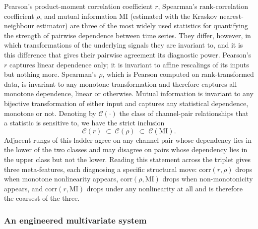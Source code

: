 \documentclass{article}
\theoremstyle{plain}
\theoremstyle{definition}
\theoremstyle{remark}
\begin{document}
Pearson's product-moment correlation coefficient $r$, Spearman's rank-correlation coefficient $\rho$, and mutual information $\mathrm{MI}$ (estimated with the Kraskov nearest-neighbour estimator) are three of the most widely used statistics for quantifying the strength of pairwise dependence between time series. They differ, however, in which transformations of the underlying signals they are invariant to, and it is this difference that gives their pairwise agreement its diagnostic power. Pearson's $r$ captures linear dependence only; it is invariant to affine rescalings of its inputs but nothing more. Spearman's $\rho$, which is Pearson computed on rank-transformed data, is invariant to any monotone transformation and therefore captures all monotone dependence, linear or otherwise. Mutual information is invariant to any bijective transformation of either input and captures any statistical dependence, monotone or not. Denoting by $\mathcal{C}(\cdot)$ the class of channel-pair relationships that a statistic is sensitive to, we have the strict inclusion
\begin{equation*}
\mathcal{C}(r) \;\subset\; \mathcal{C}(\rho) \;\subset\; \mathcal{C}(\mathrm{MI}).
\end{equation*}
Adjacent rungs of this ladder agree on any channel pair whose dependency lies in the lower of the two classes and may disagree on pairs whose dependency lies in the upper class but not the lower. Reading this statement across the triplet gives three meta-features, each diagnosing a specific structural move: $\mathrm{corr}(r,\rho)$ drops when monotone nonlinearity appears, $\mathrm{corr}(\rho,\mathrm{MI})$ drops when non-monotonicity appears, and $\mathrm{corr}(r,\mathrm{MI})$ drops under any nonlinearity at all and is therefore the coarsest of the three.

\subsubsection{An engineered multivariate system}
\end{document}
